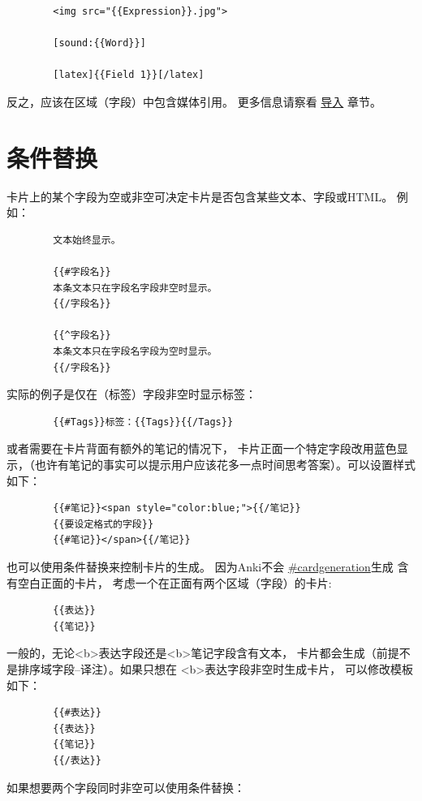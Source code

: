 \documentclass[a4paper]{book}
\newcounter{img}[chapter]
\begin{document}
	\begin{shaded}\begin{verbatim}
		<img src="{{Expression}}.jpg">
		
		[sound:{{Word}}]
		
		[latex]{{Field 1}}[/latex]
		\end{verbatim}\end{shaded}
	反之，应该在区域（字段）中包含媒体引用。 更多信息请察看 \hyperref[importing]{导入} 章节。
	\section{条件替换}\label{conditionalreplacement}
	卡片上的某个字段为空或非空可决定卡片是否包含某些文本、字段或HTML。 例如：
	
	\begin{shaded}\begin{verbatim}
		文本始终显示。
		
		{{#字段名}}
		本条文本只在字段名字段非空时显示。
		{{/字段名}}
		
		{{^字段名}}
		本条文本只在字段名字段为空时显示。
		{{/字段名}}
		\end{verbatim}\end{shaded}
	实际的例子是仅在（标签）字段非空时显示标签：
	\begin{shaded}\begin{verbatim}
		{{#Tags}}标签：{{Tags}}{{/Tags}}
		\end{verbatim}\end{shaded}
	或者需要在卡片背面有额外的笔记的情况下， 卡片正面一个特定字段改用蓝色显示，（也许有笔记的事实可以提示用户应该花多一点时间思考答案）。可以设置样式如下：
	
	\begin{shaded}\begin{verbatim}
		{{#笔记}}<span style="color:blue;">{{/笔记}}
		{{要设定格式的字段}}
		{{#笔记}}</span>{{/笔记}}
		\end{verbatim}\end{shaded}
	也可以使用条件替换来控制卡片的生成。 因为Anki不会 \url{#cardgeneration}生成 含有空白正面的卡片， 考虑一个在正面有两个区域（字段）的卡片:
	
	\begin{shaded}\begin{verbatim}
		{{表达}}
		{{笔记}}
		\end{verbatim}\end{shaded}
	一般的，无论<b>表达字段还是<b>笔记字段含有文本， 卡片都会生成（前提不是排序域字段--译注）。如果只想在
	<b>表达字段非空时生成卡片， 可以修改模板如下：
	\begin{shaded}\begin{verbatim}
		{{#表达}}
		{{表达}}
		{{笔记}}
		{{/表达}}
		\end{verbatim}\end{shaded}
	如果想要两个字段同时非空可以使用条件替换：
	
\end{document}
